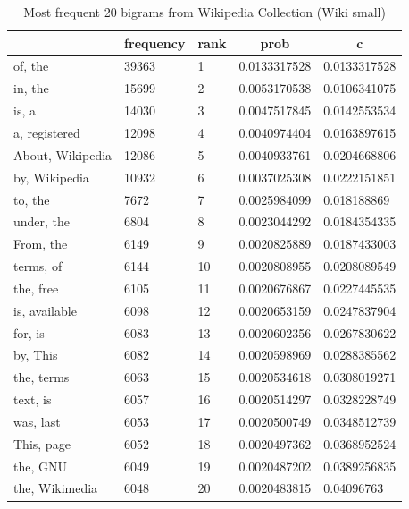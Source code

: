 \documentclass[letterpaper,11pt]{article}
\begin{document}
\begin{table}[H]
\centering
\begin{tabular}{|l|l|l|l|l|}
\hline
\rowcolor[HTML]{ECF4FF} 
\multicolumn{1}{|c|}{\cellcolor[HTML]{ECF4FF}\textbf{bigram}} & \multicolumn{1}{c|}{\cellcolor[HTML]{ECF4FF}\textbf{frequency}} & \multicolumn{1}{c|}{\cellcolor[HTML]{ECF4FF}\textbf{rank}} & \multicolumn{1}{c|}{\cellcolor[HTML]{ECF4FF}\textbf{prob}} & \multicolumn{1}{c|}{\cellcolor[HTML]{ECF4FF}\textbf{c}} \\ \hline
of, the & 39363 & 1 & 0.0133317528 & 0.0133317528 \\ \hline
in, the & 15699 & 2 & 0.0053170538 & 0.0106341075 \\ \hline
is, a & 14030 & 3 & 0.0047517845 & 0.0142553534 \\ \hline
a, registered & 12098 & 4 & 0.0040974404 & 0.0163897615 \\ \hline
About, Wikipedia & 12086 & 5 & 0.0040933761 & 0.0204668806 \\ \hline
by, Wikipedia & 10932 & 6 & 0.0037025308 & 0.0222151851 \\ \hline
to, the & 7672 & 7 & 0.0025984099 & 0.018188869 \\ \hline
under, the & 6804 & 8 & 0.0023044292 & 0.0184354335 \\ \hline
From, the & 6149 & 9 & 0.0020825889 & 0.0187433003 \\ \hline
terms, of & 6144 & 10 & 0.0020808955 & 0.0208089549 \\ \hline
the, free & 6105 & 11 & 0.0020676867 & 0.0227445535 \\ \hline
is, available & 6098 & 12 & 0.0020653159 & 0.0247837904 \\ \hline
for, is & 6083 & 13 & 0.0020602356 & 0.0267830622 \\ \hline
by, This & 6082 & 14 & 0.0020598969 & 0.0288385562 \\ \hline
the, terms & 6063 & 15 & 0.0020534618 & 0.0308019271 \\ \hline
text, is & 6057 & 16 & 0.0020514297 & 0.0328228749 \\ \hline
was, last & 6053 & 17 & 0.0020500749 & 0.0348512739 \\ \hline
This, page & 6052 & 18 & 0.0020497362 & 0.0368952524 \\ \hline
the, GNU & 6049 & 19 & 0.0020487202 & 0.0389256835 \\ \hline
the, Wikimedia & 6048 & 20 & 0.0020483815 & 0.04096763 \\ \hline
\end{tabular}
\caption{Most frequent 20 bigrams from Wikipedia Collection (Wiki small)}
\label{tab:bigrams}
\end{table}
\end{document}

